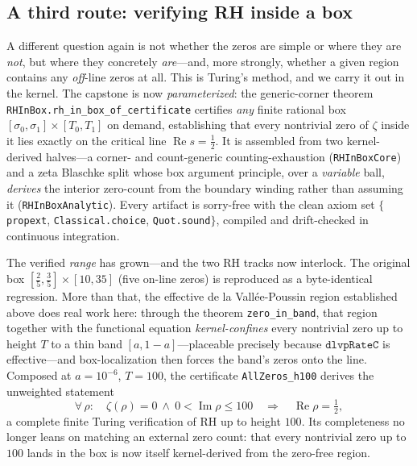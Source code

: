 \subsection{A third route: verifying RH inside a box}

A different question again is not whether the zeros are simple or where they are
\emph{not}, but where they concretely \emph{are}---and, more strongly, whether a
given region contains any \emph{off}-line zeros at all. This is Turing's method,
and we carry it out in the kernel. The capstone is now \emph{parameterized}: the
generic-corner theorem \texttt{RHInBox.rh\_in\_box\_of\_certificate} certifies
\emph{any} finite rational box $[\sigma_0,\sigma_1] \times [T_0,T_1]$ on demand,
establishing that every nontrivial zero of $\zeta$ inside it lies exactly on the
critical line $\operatorname{Re} s = \tfrac12$. It is assembled from two
kernel-derived halves---a corner- and count-generic counting-exhaustion
(\texttt{RHInBoxCore}) and a zeta Blaschke split whose box argument principle, over
a \emph{variable} ball, \emph{derives} the interior zero-count from the boundary
winding rather than assuming it (\texttt{RHInBoxAnalytic}). Every artifact is
sorry-free with the clean axiom set $\{$\texttt{propext}, \texttt{Classical.choice},
\texttt{Quot.sound}$\}$, compiled and drift-checked in continuous integration.

The verified \emph{range} has grown---and the two RH tracks now interlock. The
original box $[\tfrac{2}{5}, \tfrac{3}{5}] \times [10, 35]$ (five on-line zeros) is
reproduced as a byte-identical regression. More than that, the effective de la
Vallée-Poussin region established above does real work here: through the theorem
\texttt{zero\_in\_band}, that region together with the functional equation
\emph{kernel-confines} every nontrivial zero up to height $T$ to a thin band
$[a, 1-a]$---placeable precisely because $\mathtt{dlvpRateC}$ is effective---and
box-localization then forces the band's zeros onto the line. Composed at
$a = 10^{-6}$, $T = 100$, the certificate \texttt{AllZeros\_h100} derives the
unweighted statement
\[
  \forall\, \rho:\quad \zeta(\rho) = 0 \ \wedge\ 0 < \operatorname{Im}\rho \le 100
  \quad\Longrightarrow\quad \operatorname{Re}\rho = \tfrac12,
\]
a complete finite Turing verification of RH up to height $100$. Its completeness no
longer leans on matching an external zero count: that every nontrivial zero up to
$100$ lands in the box is now itself kernel-derived from the zero-free region.

